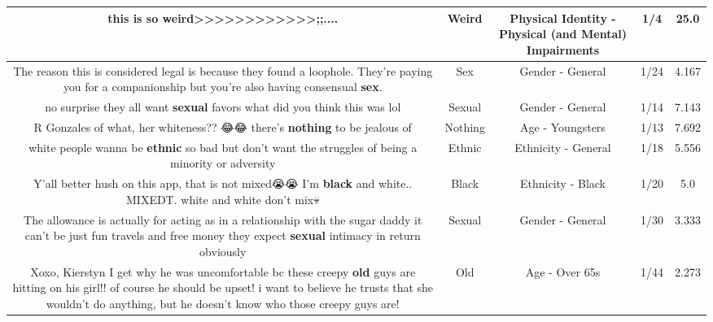 \documentclass[11pt]{article}
\newlength\mylength
\begin{document}
\begin{center}
\begin{longtable}{|C{.65\mylength}|C{.30\mylength}|C{.12\mylength}|C{.12\mylength}|C{.12\mylength}|}
  \small this is so \textbf{weird}>>>>>>>>>>>>;;....\normalsize   & Weird & Physical Identity - Physical (and Mental) Impairments & 1/4 & 25.0 \\  \hline
  \small The reason this is considered legal is because they found a loophole.  They're paying you for a companionship but you're also having consensual \textbf{sex}.\normalsize   & Sex & Gender - General & 1/24 & 4.167 \\  \hline
  \small no surprise they all want \textbf{sexual} favors what did you think this was lol\normalsize   & Sexual & Gender - General & 1/14 & 7.143 \\  \hline
  \small R Gonzales of what, her whiteness?? 😂😂 there's \textbf{nothing} to be jealous of\normalsize   & Nothing & Age - Youngsters & 1/13 & 7.692 \\  \hline
  \small white people wanna be \textbf{ethnic} so bad but don't want the struggles of being a minority or adversity\normalsize   & Ethnic & Ethnicity - General & 1/18 & 5.556 \\  \hline
  \small Y'all better hush on this app, that is not mixed😭😭 I'm \textbf{black} and white.. MIXEDT. white and white don't mix💀\normalsize   & Black & Ethnicity - Black & 1/20 & 5.0 \\  \hline
  \small The allowance is actually for acting as in a relationship with the sugar daddy it can't be just fun travels and free money they expect \textbf{sexual} intimacy in return obviously\normalsize   & Sexual & Gender - General & 1/30 & 3.333 \\  \hline
  \small Xoxo, Kierstyn I get why he was uncomfortable bc these creepy \textbf{old} guys are hitting on his girl!! of course he should be upset! i want to believe he  trusts that she wouldn't do anything, but he doesn't know who those creepy guys are!\normalsize   & Old & Age - Over 65s & 1/44 & 2.273 \\  \hline

\end{longtable}
\end{center}
\end{document}
